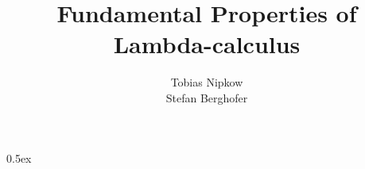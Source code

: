\documentclass[11pt,a4paper]{article}
\begin{document}
\title{Fundamental Properties of Lambda-calculus}
\author{Tobias Nipkow \\ Stefan Berghofer}
\maketitle

\tableofcontents
\newpage

\parindent 0pt \parskip 0.5ex










\end{document}
